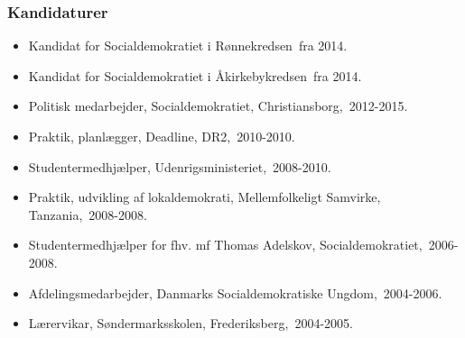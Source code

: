 \documentclass[11pt, a4paper]{awesome-cv}
\begin{document}
\begin{cvletter}
\subsubsection*{Kandidaturer}
\begin{itemize}
\item Kandidat for Socialdemokratiet i Rønnekredsen fra 2014.
\item Kandidat for Socialdemokratiet i Åkirkebykredsen fra 2014.
\end{itemize}
\begin{itemize}
\item Politisk medarbejder, Socialdemokratiet, Christiansborg, 2012-2015.
\item Praktik, planlægger, Deadline, DR2, 2010-2010.
\item Studentermedhjælper, Udenrigsministeriet, 2008-2010.
\item Praktik, udvikling af lokaldemokrati, Mellemfolkeligt Samvirke, Tanzania, 2008-2008.
\item Studentermedhjælper for fhv. mf Thomas Adelskov, Socialdemokratiet, 2006-2008.
\item Afdelingsmedarbejder, Danmarks Socialdemokratiske Ungdom, 2004-2006.
\item Lærervikar, Søndermarksskolen, Frederiksberg, 2004-2005.
\end{itemize}
\end{cvletter}
\end{document}
